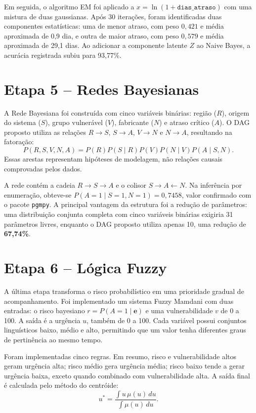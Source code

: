 \documentclass[12pt]{article}
\begin{document}
Em seguida, o algoritmo EM foi aplicado a $x=\ln(1+\texttt{dias\_atraso})$ com uma mistura de duas gaussianas. Após 30 iterações, foram identificadas duas componentes estatísticas: uma de menor atraso, com peso $0,421$ e média aproximada de 0,9 dia, e outra de maior atraso, com peso $0,579$ e média aproximada de 29,1 dias. Ao adicionar a componente latente $Z$ ao Naive Bayes, a acurácia registrada subiu para 93,77\%.

\section{Etapa 5 -- Redes Bayesianas}

A Rede Bayesiana foi construída com cinco variáveis binárias: região ($R$), origem do sistema ($S$), grupo vulnerável ($V$), fabricante ($N$) e atraso crítico ($A$). O DAG proposto utiliza as relações $R\to S$, $S\to A$, $V\to N$ e $N\to A$, resultando na fatoração:
\begin{equation}
P(R,S,V,N,A)=P(R)P(S\mid R)P(V)P(N\mid V)P(A\mid S,N).
\end{equation}
Essas arestas representam hipóteses de modelagem, não relações causais comprovadas pelos dados.

A rede contém a cadeia $R\to S\to A$ e o colisor $S\to A\leftarrow N$. Na inferência por enumeração, obteve-se $P(A=1\mid S=1,N=1)=0,7458$, valor confirmado com o pacote \texttt{pgmpy}. A principal vantagem da estrutura foi a redução de parâmetros: uma distribuição conjunta completa com cinco variáveis binárias exigiria 31 parâmetros livres, enquanto o DAG proposto utiliza apenas 10, uma redução de \textbf{67,74\%}.

\section{Etapa 6 -- Lógica Fuzzy}

A última etapa transforma o risco probabilístico em uma prioridade gradual de acompanhamento. Foi implementado um sistema Fuzzy Mamdani com duas entradas: o risco bayesiano $r=P(A=1\mid\mathbf e)$ e uma vulnerabilidade $v$ de 0 a 100. A saída é a urgência $u$, também de 0 a 100. Cada variável possui conjuntos linguísticos baixo, médio e alto, permitindo que um valor tenha diferentes graus de pertinência ao mesmo tempo.

Foram implementadas cinco regras. Em resumo, risco e vulnerabilidade altos geram urgência alta; risco médio gera urgência média; risco baixo tende a gerar urgência baixa, exceto quando combinado com vulnerabilidade alta. A saída final é calculada pelo método do centróide:
\begin{equation}
u^*=\frac{\int u\,\mu(u)\,du}{\int \mu(u)\,du}.
\end{equation}
\end{document}
